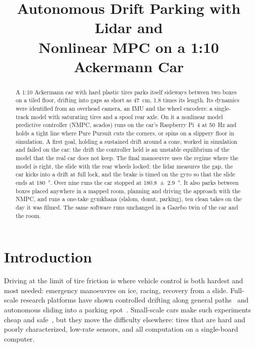\documentclass[conference]{IEEEtran}
\begin{document}
\title{Autonomous Drift Parking with Lidar and\\ Nonlinear MPC on a 1:10 Ackermann Car}

\author{
}

\maketitle


\begin{abstract}
A 1:10 Ackermann car with hard plastic tires parks itself sideways between two boxes on a tiled floor, drifting
into gaps as short as \SI{47}{cm}, 1.8 times its length. Its dynamics were identified from an overhead
camera, an IMU and the wheel encoders: a single-track model with saturating tires and a spool rear axle. On it a
nonlinear model predictive controller (NMPC, acados) runs on the car's Raspberry Pi~4 at \SI{50}{Hz} and holds a
tight line where Pure Pursuit cuts the corners, or spins on a slippery floor in simulation. A first goal, holding a
sustained drift around a cone, worked in simulation and failed on the car: the drift the controller held is an
unstable equilibrium of the model that the real car does not keep. The final manoeuvre uses the regime where the
model is right, the slide with the rear wheels locked: the lidar measures the gap, the car kicks into a drift at
full lock, and the brake is timed on the gyro so that the slide ends at \SI{180}{\degree}. Over nine runs the car
stopped at \SI{180.8 \pm 2.9}{\degree}. It also parks between boxes placed anywhere in a mapped room, planning and
driving the approach with the NMPC, and runs a one-take gymkhana (slalom, donut, parking), ten clean takes on the day it was filmed.
The same software runs unchanged in a Gazebo twin of the car and the room.
\end{abstract}

\section{Introduction}

Driving at the limit of tire friction is where vehicle control is both hardest and most needed: emergency
manoeuvres on ice, racing, recovery from a slide. Full-scale research platforms have shown controlled drifting
along general paths~\cite{hindiyeh2014,goh2020} and autonomous sliding into a parking spot~\cite{kolter2010}.
Small-scale cars make such experiments cheap and safe~\cite{liniger2015,okelly2020,cutler2016}, but they move the
difficulty elsewhere: tires that are hard and poorly characterized, low-rate sensors, and all computation on a
single-board computer.
\end{document}
